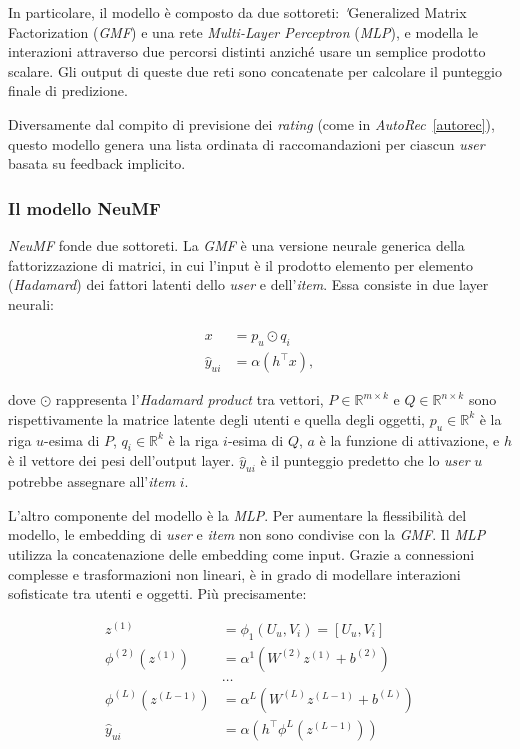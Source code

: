In particolare, il modello è composto da due sottoreti: \textit'{Generalized Matrix Factorization} (\textit{GMF}) e una rete \textit{Multi-Layer Perceptron} (\textit{MLP}), e modella le interazioni attraverso due percorsi distinti anziché usare un semplice prodotto scalare. Gli output di queste due reti sono concatenate per calcolare il punteggio finale di predizione.

Diversamente dal compito di previsione dei \textit{rating} (come in \textit{AutoRec}~\ref{autorec}), questo modello genera una lista ordinata di raccomandazioni per ciascun \textit{user} basata su feedback implicito.

\subsubsection{Il modello NeuMF}\label{neufm}

\textit{NeuMF} fonde due sottoreti. La \textit{GMF} è una versione neurale generica della fattorizzazione di matrici, in cui l'input è il prodotto elemento per elemento (\textit{Hadamard}) dei fattori latenti dello \textit{user} e dell'\textit{item}. Essa consiste in due layer neurali:

\[
\begin{split}
x &= p_u \odot q_i \\
\hat{y}_{ui} &= \alpha(h^\top x),
\end{split}
\]

dove $\odot$ rappresenta l'\textit{Hadamard product} tra vettori, $P \in \mathbb{R}^{m \times k}$ e $Q \in \mathbb{R}^{n \times k}$ sono rispettivamente la matrice latente degli utenti e quella degli oggetti, $p_u \in \mathbb{R}^{k}$ è la riga $u$-esima di $P$, $q_i \in \mathbb{R}^{ k}$ è la riga $i$-esima di $Q$, $a$ è la funzione di attivazione, e $h$ è il vettore dei pesi dell'output layer.  
$\hat{y}_{ui}$ è il punteggio predetto che lo \textit{user} $u$ potrebbe assegnare all'\textit{item} $i$.

L'altro componente del modello è la \textit{MLP}. Per aumentare la flessibilità del modello, le embedding di \textit{user} e \textit{item} non sono condivise con la \textit{GMF}. Il \textit{MLP} utilizza la concatenazione delle embedding come input. Grazie a connessioni complesse e trasformazioni non lineari, è in grado di modellare interazioni sofisticate tra utenti e oggetti. Più precisamente:

\[
\begin{aligned}
z^{(1)} &= \phi_1(U_u, V_i) = \left[ U_u, V_i \right] \\
\phi^{(2)}(z^{(1)}) &= \alpha^1(W^{(2)} z^{(1)} + b^{(2)}) \\
&\dots \\
\phi^{(L)}(z^{(L-1)}) &= \alpha^L(W^{(L)} z^{(L-1)} + b^{(L)}) \\
\hat{y}_{ui} &= \alpha(h^\top \phi^L(z^{(L-1)}))
\end{aligned}
\]


